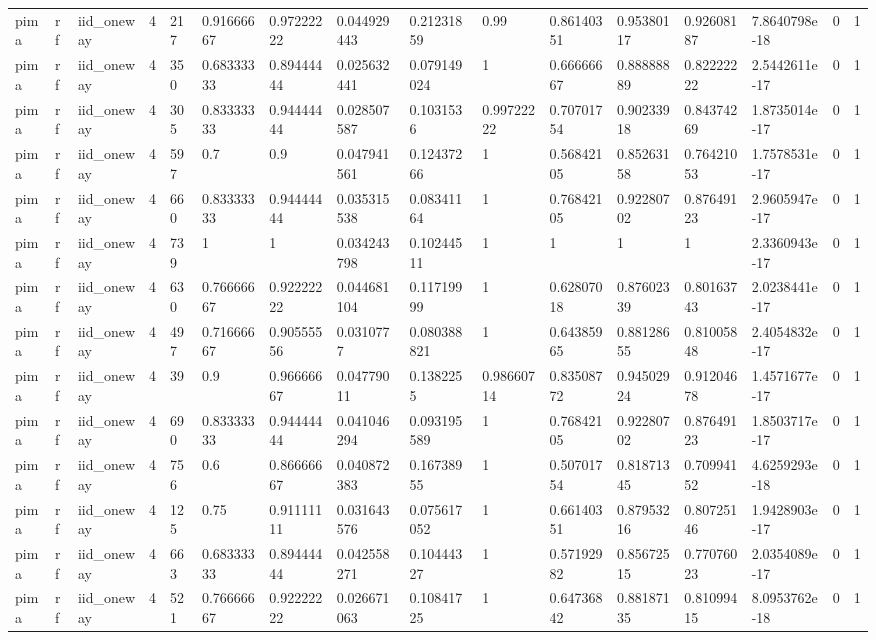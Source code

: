 \begin{tabular}{llllllllllllllll}
pima & rf & iid\_oneway & 4 & 217 & 0.91666667 & 0.97222222 & 0.044929443 & 0.21231859 & 0.99 & 0.86140351 & 0.95380117 & 0.92608187 & 7.8640798e-18 & 0 & 1 \\
pima & rf & iid\_oneway & 4 & 350 & 0.68333333 & 0.89444444 & 0.025632441 & 0.079149024 & 1 & 0.66666667 & 0.88888889 & 0.82222222 & 2.5442611e-17 & 0 & 1 \\
pima & rf & iid\_oneway & 4 & 305 & 0.83333333 & 0.94444444 & 0.028507587 & 0.1031536 & 0.99722222 & 0.70701754 & 0.90233918 & 0.84374269 & 1.8735014e-17 & 0 & 1 \\
pima & rf & iid\_oneway & 4 & 597 & 0.7 & 0.9 & 0.047941561 & 0.12437266 & 1 & 0.56842105 & 0.85263158 & 0.76421053 & 1.7578531e-17 & 0 & 1 \\
pima & rf & iid\_oneway & 4 & 660 & 0.83333333 & 0.94444444 & 0.035315538 & 0.08341164 & 1 & 0.76842105 & 0.92280702 & 0.87649123 & 2.9605947e-17 & 0 & 1 \\
pima & rf & iid\_oneway & 4 & 739 & 1 & 1 & 0.034243798 & 0.10244511 & 1 & 1 & 1 & 1 & 2.3360943e-17 & 0 & 1 \\
pima & rf & iid\_oneway & 4 & 630 & 0.76666667 & 0.92222222 & 0.044681104 & 0.11719999 & 1 & 0.62807018 & 0.87602339 & 0.80163743 & 2.0238441e-17 & 0 & 1 \\
pima & rf & iid\_oneway & 4 & 497 & 0.71666667 & 0.90555556 & 0.0310777 & 0.080388821 & 1 & 0.64385965 & 0.88128655 & 0.81005848 & 2.4054832e-17 & 0 & 1 \\
pima & rf & iid\_oneway & 4 & 39 & 0.9 & 0.96666667 & 0.04779011 & 0.1382255 & 0.98660714 & 0.83508772 & 0.94502924 & 0.91204678 & 1.4571677e-17 & 0 & 1 \\
pima & rf & iid\_oneway & 4 & 690 & 0.83333333 & 0.94444444 & 0.041046294 & 0.093195589 & 1 & 0.76842105 & 0.92280702 & 0.87649123 & 1.8503717e-17 & 0 & 1 \\
pima & rf & iid\_oneway & 4 & 756 & 0.6 & 0.86666667 & 0.040872383 & 0.16738955 & 1 & 0.50701754 & 0.81871345 & 0.70994152 & 4.6259293e-18 & 0 & 1 \\
pima & rf & iid\_oneway & 4 & 125 & 0.75 & 0.91111111 & 0.031643576 & 0.075617052 & 1 & 0.66140351 & 0.87953216 & 0.80725146 & 1.9428903e-17 & 0 & 1 \\
pima & rf & iid\_oneway & 4 & 663 & 0.68333333 & 0.89444444 & 0.042558271 & 0.10444327 & 1 & 0.57192982 & 0.85672515 & 0.77076023 & 2.0354089e-17 & 0 & 1 \\
pima & rf & iid\_oneway & 4 & 521 & 0.76666667 & 0.92222222 & 0.026671063 & 0.10841725 & 1 & 0.64736842 & 0.88187135 & 0.81099415 & 8.0953762e-18 & 0 & 1 \\

\end{tabular}
